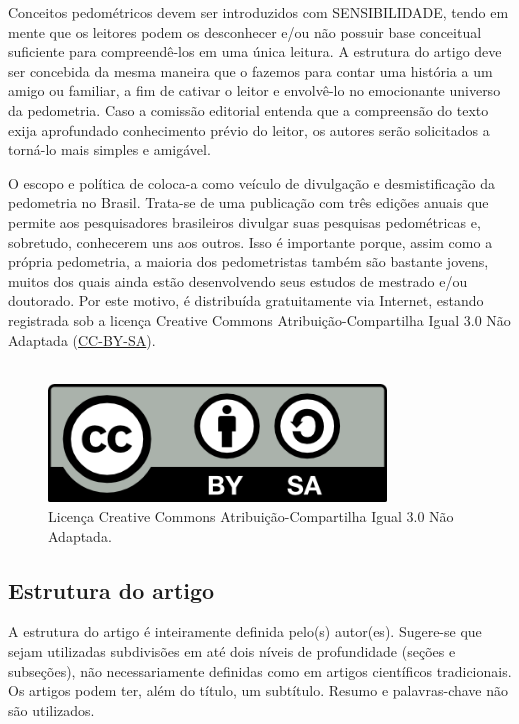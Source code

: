 Conceitos pedométricos devem ser introduzidos com SENSIBILIDADE, tendo em mente que os leitores podem os desconhecer e/ou não possuir base conceitual suficiente para compreendê-los em uma única leitura. A estrutura do artigo deve ser concebida da mesma maneira que o fazemos para contar uma história a um amigo ou familiar, a fim de cativar o leitor e envolvê-lo no emocionante universo da pedometria. Caso a comissão editorial entenda que a compreensão do texto exija aprofundado conhecimento prévio do leitor, os autores serão solicitados a torná-lo mais simples e amigável.

O escopo e política de \pedometria{} coloca-a como veículo de divulgação e desmistificação da pedometria no Brasil. Trata-se de uma publicação com três edições anuais que permite aos pesquisadores brasileiros divulgar suas pesquisas pedométricas e, sobretudo, conhecerem uns aos outros. Isso é importante porque, assim como a própria pedometria, a maioria dos pedometristas também são bastante jovens, muitos dos quais ainda estão desenvolvendo seus estudos de mestrado e/ou doutorado. Por este motivo, \pedometria{} é distribuída gratuitamente via Internet, estando registrada sob a licença Creative Commons Atribuição-Compartilha Igual 3.0 Não Adaptada (\href{http://creativecommons.org/licenses/by-sa/2.0/}{CC-BY-SA}).\\
\\
\begin{figure}[h!]
 \centering
 \includegraphics[width=0.8\textwidth]{figuras/cc-by-sa}
 \caption{Licença Creative Commons Atribuição-Compartilha Igual 3.0 Não Adaptada.}
\end{figure}

\subsection{Estrutura do artigo}

A estrutura do artigo é inteiramente definida pelo(s) autor(es). Sugere-se que sejam utilizadas subdivisões em até dois níveis de profundidade (seções e subseções), não necessariamente definidas como em artigos científicos tradicionais. Os artigos podem ter, além do título, um subtítulo. Resumo e palavras-chave não são utilizados.

